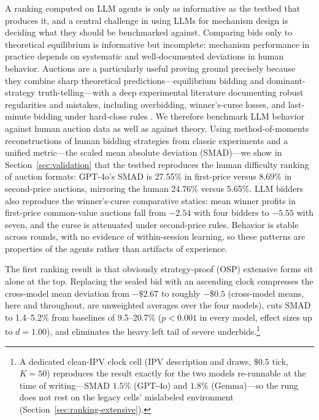 A ranking computed on LLM agents is only as informative as the testbed that produces it, and a central challenge in using LLMs for mechanism design is deciding what they should be benchmarked against. Comparing bids only to theoretical equilibrium is informative but incomplete: mechanism performance in practice depends on systematic and well-documented deviations in human behavior. Auctions are a particularly useful proving ground precisely because they combine sharp theoretical predictions---equilibrium bidding and dominant-strategy truth-telling---with a deep experimental literature documenting robust regularities and mistakes, including overbidding, winner's-curse losses, and last-minute bidding under hard-close rules \citep{kagel2020handbook}. We therefore benchmark LLM behavior against human auction data as well as against theory. Using method-of-moments reconstructions of human bidding strategies from classic experiments \citep{kagel1993independent, kagel1986winner, li2017obviously, breitmoser2022obviousness, gonczarowski2024describing} and a unified metric---the scaled mean absolute deviation (SMAD)---we show in Section~\ref{sec:validation} that the testbed reproduces the human difficulty ranking of auction formats: GPT-4o's SMAD is 27.55\% in first-price versus 8.69\% in second-price auctions, mirroring the human 24.76\% versus 5.65\%. LLM bidders also reproduce the winner's-curse comparative statics: mean winner profits in first-price common-value auctions fall from $-2.54$ with four bidders to $-5.55$ with seven, and the curse is attenuated under second-price rules. Behavior is stable across rounds, with no evidence of within-session learning, so these patterns are properties of the agents rather than artifacts of experience.

The first ranking result is that obviously strategy-proof (OSP) extensive forms sit alone at the top. Replacing the sealed bid with an ascending clock compresses the cross-model mean deviation from $-\$2.67$ to roughly $-\$0.5$ (cross-model means, here and throughout, are unweighted averages over the four models), cuts SMAD to 1.4--5.2\% from baselines of 9.5--20.7\% ($p<0.001$ in every model, effect sizes up to $d=1.00$), and eliminates the heavy left tail of severe underbids.\footnote{A dedicated clean-IPV clock cell (IPV description and draws, $\$0.5$ tick, $K=50$) reproduces the result exactly for the two models re-runnable at the time of writing---SMAD $1.5\%$ (GPT-4o) and $1.8\%$ (Gemma)---so the rung does not rest on the legacy cells' mislabeled environment (Section~\ref{sec:ranking-extensive}).}

